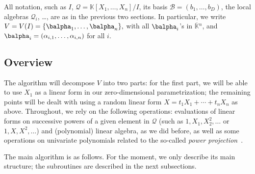 \documentclass[12pt]{article}
\newcommand{\basis}{\mathscr{B}}
\newcommand{\lf}{X}
\newcommand{\residueI}{\mathscr{Q}}
\def\dg{\kappa}
\def\K{\mathbb{K}}
\def\K {\ensuremath{\mathbb{K}}}
\def\Kbar {{\ensuremath{\overline{\mathbb{K}}}}}
\begin{document}
All notation, such as $I$, $\residueI=\K[X_1,\dots,X_n]/I$, its basis
$\basis=(b_1,\dots,b_D)$, the local algebras $\residueI_i$, \dots, are as in the  previous two sections.
In particular, we write $V=V(I)=\{\balpha_1,\dots,\balpha_\dg\},$ with
all $\balpha_i$'s in $\Kbar{}^n$, and
$\balpha_i=(\alpha_{i,1},\dots,\alpha_{i,n})$ for all $i$.


\subsection{Overview}

The algorithm will decompose $V$ into two parts: for the first part,
we will be able to use $X_1$ as a linear form in our zero-dimensional
parametrization; the remaining points will be dealt with using a
random linear form $\lf=t_1 X_1 + \cdots + t_n X_n$ as
above. Throughout, we rely on the following operations: evaluations of
linear forms on successive powers of a given element in $\residueI$
(such as $1,X_1,X_2^2,\dots$ or $1,\lf,\lf^2,\dots$) and (polynomial)
linear algebra, as we did before, as well as some operations on
univariate polynomials related to the so-called {\em power
  projection}~\cite{Shoup94,Shoup99}.

The main algorithm is as follows. For the moment, we only describe its
main structure; the subroutines are described in the next subsections.
\end{document}
